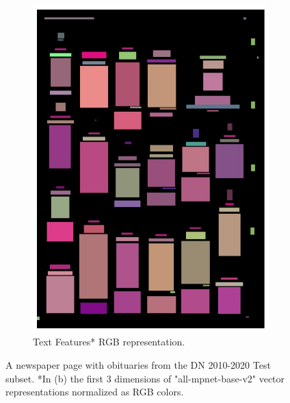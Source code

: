 \documentclass[oneside, english, bibtex]{kththesis}
\begin{document}
\begin{figure}[!htb]
\begin{adjustbox}{center,max size={\textwidth}{0.9\textheight}}
{\begin{subfigure}{0.75\textwidth}
  \includegraphics[width=\linewidth, clip=true, trim = 0mm 0mm 0mm 0mm]{figures/tf/GQU6vjW.jpg}
  \caption{Text Features* RGB representation.}
  \label{fig:GQU6vjW_tf}
\end{subfigure}}
\end{adjustbox}
  \caption{A newspaper page with obituaries from the DN 2010-2020 Test subset. *In (b) the first 3 dimensions of "all-mpnet-base-v2" vector representations normalized as RGB colors.}
\label{fig:GQU6vjW_tf}
\end{figure}

\clearpage
\end{document}

